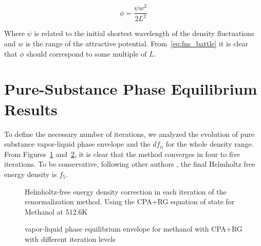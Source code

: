 \documentclass[preprint,12pt,3p]{elsarticle}
\begin{document}
\begin{equation} \label{eq:fns_battle}
\phi = \frac{\psi w^2}{2L^2}
\end{equation}

Where $\psi$ is related to the initial shortest wavelength of the density fluctuations and $w$ is the range of the attractive potential.
From~\ref{eq:fns_battle} it is clear that $\phi$ should correspond to some multiple of $L$.

\section{Pure-Substance Phase Equilibrium Results}
\label{sec:pure-substance phase equilibrium results}

To define the necessary number of iterations, we analyzed the evolution of pure substance vapor-liquid phase envelope and the $df_{n}$ for the whole density range.
From Figures~\ref{fig:dfn} and~\ref{fig:PV_evol}, it is clear that the method converges in four to five iterations.
To be conservative, following other authors  \cite{llovell2004thermodynamic,cai2004thermodynamics,pcm2017application}, the final Helmholtz free energy density is $f_{5}$.

\begin{figure}[h!]
\centering
\captionsetup{justification=centering}
\caption{Helmholtz-free energy density correction in each iteration of the renormalization method.
Using the CPA+RG equation of state for Methanol at 512.6K}
\label{fig:dfn}
\end{figure}

\begin{figure}[h!]
\centering
\captionsetup{justification=centering}
\caption{vapor-liquid phase equilibrium envelope for methanol with CPA+RG with different iteration levels}
\label{fig:PV_evol}
\end{figure}
\end{document}
